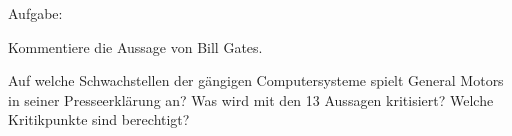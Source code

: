 

Aufgabe:

\begin{compactenum}
\item Kommentiere die Aussage von Bill Gates.
\item Auf welche Schwachstellen der gängigen Computersysteme spielt General
Motors in seiner Presseerklärung an? Was wird mit den 13 Aussagen kritisiert?
Welche Kritikpunkte sind berechtigt?
\end{compactenum}